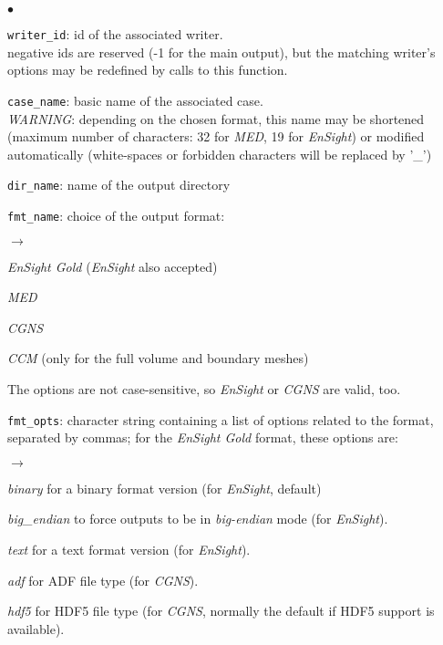 {{{\begin{list}{$\bullet$}{}
       \item \texttt{writer\_id}: id of the associated writer.\\
             negative ids are reserved (-1 for the main output),
             but the matching writer's options may be redefined by
             calls to this function.
       \item \texttt{case\_name}: basic name of the associated case.\\ {\em
             WARNING}: depending on the chosen format, this name may
             be shortened (maximum number of characters: 32 for {\em MED},
             19 for {\em EnSight}) or modified automatically (white-spaces or
             forbidden characters will be replaced by '\_')
       \item \texttt{dir\_name}: name of the output directory
       \item \texttt{fmt\_name}: choice of the output format:
        \begin{list}{$\rightarrow$}{}
               \item {\em EnSight Gold} ({\em EnSight} also accepted)
               \item {\em MED}
               \item {\em CGNS}
               \item {\em CCM} (only for the full volume and boundary meshes)
         \end{list}
The options are not case-sensitive, so {\em EnSight} or {\em CGNS} are valid, too.
       \item \texttt{fmt\_opts}: character string containing a list of
             options related to the format, separated by commas; for the
             {\em EnSight Gold} format, these options are:
        \begin{list}{$\rightarrow$}{}
               \item {\em binary} for a binary format version (for {\em EnSight}, default)
               \item {\em big\_endian} to force outputs to be in {\em big-endian}
                 mode (for {\em EnSight}).
               \item {\em text} for a text format version (for {\em EnSight}).
               \item {\em adf} for ADF file type (for {\em CGNS}).
               \item {\em hdf5} for HDF5 file type (for {\em CGNS}, normally the
                 default if HDF5 support is available).

\end{list}
\end{list}}}}
